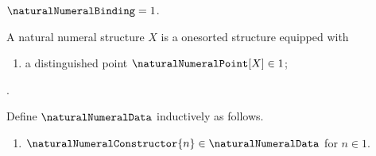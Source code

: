\begin{definition}\label{natural_numeral_binding}
    $\naturalNumeralBinding=1$.
\end{definition}

\begin{struct}\label{natural_numeral_structure}
    A natural numeral structure $X$ is a onesorted structure equipped with
    \begin{enumerate}
        \item\label{natural_numeral_structure_point}
            a distinguished point
            $\naturalNumeralPoint[X]\in 1$;
    \end{enumerate}
    .
\end{struct}

\begin{datatype}\label{natural_numeral_datatype}
    Define $\naturalNumeralData$ inductively as follows.
    \begin{enumerate}
        \item $\naturalNumeralConstructor{n}\in\naturalNumeralData$ for
            $n\in 1$.
    \end{enumerate}
\end{datatype}
